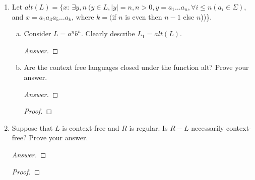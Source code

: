 \documentclass[10pt]{article}
\newcommand{\card}[1]{\left| #1 \right|}
\begin{document}
\begin{enumerate}[1)]

\item
Let $alt(L) = \{x:\ \exists y, n\ (y \in L, \card{y} = n, n > 0, y = a_1 \ldots a_n, \forall i \leq n (a_i \in \Sigma)$, and $x = a_1a_3a_5\ldots a_k$, where $k = ($if $n$ is even then $n-1$ else $n$))\}.
\begin{enumerate}[a)]
\item
Consider $L = a^nb^n$.  Clearly describe $L_1 = alt(L)$.
\begin{proof}[Answer]
\end{proof}

\item
Are the context free languages closed under the function alt?  Prove your answer.
\begin{proof}[Answer]
\end{proof}
\begin{proof}[Proof]
\end{proof}
\end{enumerate}


\item
Suppose that $L$ is context-free and $R$ is regular.  Is $R - L$ necessarily context-free?  Prove your answer.
\begin{proof}[Answer]
\end{proof}
\begin{proof}[Proof]
\end{proof}
\end{enumerate}
\end{document}
